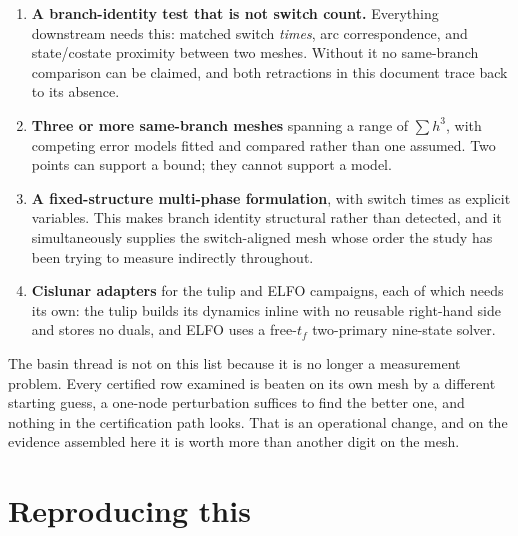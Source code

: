 \documentclass[11pt]{article}
\begin{document}
\begin{enumerate}
  \item \textbf{A branch-identity test that is not switch count.} Everything
  downstream needs this: matched switch \emph{times}, arc correspondence, and
  state/costate proximity between two meshes. Without it no same-branch
  comparison can be claimed, and both retractions in this document trace back
  to its absence.
  \item \textbf{Three or more same-branch meshes} spanning a range of
  $\sum h^3$, with competing error models fitted and compared rather than one
  assumed. Two points can support a bound; they cannot support a model.
  \item \textbf{A fixed-structure multi-phase formulation}, with switch times as
  explicit variables. This makes branch identity structural rather than
  detected, and it simultaneously supplies the switch-aligned mesh whose order
  the study has been trying to measure indirectly throughout.
  \item \textbf{Cislunar adapters} for the tulip and ELFO campaigns, each of
  which needs its own: the tulip builds its dynamics inline with no reusable
  right-hand side and stores no duals, and ELFO uses a free-$t_f$ two-primary
  nine-state solver.
\end{enumerate}

\noindent The basin thread is not on this list because it is no longer a
measurement problem. Every certified row examined is beaten on its own mesh by a
different starting guess, a one-node perturbation suffices to find the better
one, and nothing in the certification path looks. That is an operational change,
and on the evidence assembled here it is worth more than another digit on the
mesh.

\section*{Reproducing this}
\end{document}
